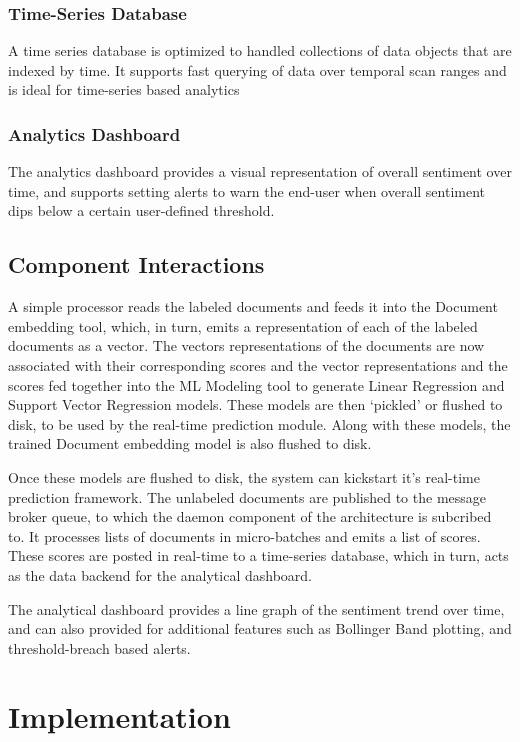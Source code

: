 \documentclass[conference]{IEEEtran}
\begin{document}
\subsubsection{Time-Series Database}
A time series database is optimized to handled collections of data objects that are indexed by time. 
It supports fast querying of data over temporal scan ranges and is ideal for time-series based analytics

\subsubsection{Analytics Dashboard}
The analytics dashboard provides a visual representation of overall sentiment over time, and supports setting alerts to warn the end-user when overall sentiment dips below a certain user-defined threshold.

\subsection{Component Interactions} \label{Component Interactions}
A simple processor reads the labeled documents and feeds it into the Document embedding tool, which, in turn, emits a representation of each of the labeled documents as a vector.
The vectors representations of the documents are now associated with their corresponding scores and the vector representations and the scores fed together into the ML Modeling tool to generate Linear Regression and Support Vector Regression models. 
These models are then `pickled' or flushed to disk, to be used by the real-time prediction module. 
Along with these models, the trained Document embedding model is also flushed to disk.

Once these models are flushed to disk, the system can kickstart it's real-time prediction framework. 
The unlabeled documents are published to the message broker queue, to which the daemon component of the architecture is subcribed to. 
It processes lists of documents in micro-batches and emits a list of scores. 
These scores are posted in real-time to a time-series database, which in turn, acts as the data backend for the analytical dashboard.

The analytical dashboard provides a line graph of the sentiment trend over time, and can also provided for additional features such as Bollinger Band plotting, and threshold-breach based alerts.


\vspace{5mm}

\section{Implementation}
\end{document}
